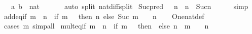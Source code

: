 \begin{isabellebody}
\ \ \ a\ b\ {\isacharcolon}{\kern0pt}{\isacharcolon}{\kern0pt}\ nat\isanewline
\ \ %
\isanewline
%
\isadelimproof
\ \ %
\endisadelimproof
%
\isatagproof
{}\isamarkupfalse%
\ {\isacharparenleft}{\kern0pt}auto\ split{\isacharcolon}{\kern0pt}\ nat{\isacharunderscore}{\kern0pt}diff{\isacharunderscore}{\kern0pt}split{\isacharparenright}{\kern0pt}%
\endisatagproof
{\isafoldproof}%
%
\isadelimproof
\isanewline
%
\endisadelimproof
\isanewline
{}\isamarkupfalse%
\ Suc{\isacharunderscore}{\kern0pt}pred{\isacharprime}{\kern0pt}{\isacharcolon}{\kern0pt}\ {\isachardoublequoteopen}{}\ {\isacharless}{\kern0pt}\ n\ {\isasymLongrightarrow}\ n\ {\isacharequal}{\kern0pt}\ Suc{\isacharparenleft}{\kern0pt}n\ {\isacharminus}{\kern0pt}\ {}{\isacharparenright}{\kern0pt}{\isachardoublequoteclose}\isanewline
%
\isadelimproof
\ \ %
\endisadelimproof
%
\isatagproof
{}\isamarkupfalse%
\ simp%
\endisatagproof
{\isafoldproof}%
%
\isadelimproof
\isanewline
%
\endisadelimproof
\isanewline
{}\isamarkupfalse%
\ add{\isacharunderscore}{\kern0pt}eq{\isacharunderscore}{\kern0pt}if{\isacharcolon}{\kern0pt}\ {\isachardoublequoteopen}m\ {\isacharplus}{\kern0pt}\ n\ {\isacharequal}{\kern0pt}\ {\isacharparenleft}{\kern0pt}if\ m\ {\isacharequal}{\kern0pt}\ {}\ then\ n\ else\ Suc\ {\isacharparenleft}{\kern0pt}{\isacharparenleft}{\kern0pt}m\ {\isacharminus}{\kern0pt}\ {}{\isacharparenright}{\kern0pt}\ {\isacharplus}{\kern0pt}\ n{\isacharparenright}{\kern0pt}{\isacharparenright}{\kern0pt}{\isachardoublequoteclose}\isanewline
%
\isadelimproof
\ \ %
\endisadelimproof
%
\isatagproof
{}\isamarkupfalse%
\ One{\isacharunderscore}{\kern0pt}nat{\isacharunderscore}{\kern0pt}def\ \isamarkupfalse%
\ {\isacharparenleft}{\kern0pt}cases\ m{\isacharparenright}{\kern0pt}\ simp{\isacharunderscore}{\kern0pt}all%
\endisatagproof
{\isafoldproof}%
%
\isadelimproof
\isanewline
%
\endisadelimproof
\isanewline
{}\isamarkupfalse%
\ mult{\isacharunderscore}{\kern0pt}eq{\isacharunderscore}{\kern0pt}if{\isacharcolon}{\kern0pt}\ {\isachardoublequoteopen}m\ {\isacharasterisk}{\kern0pt}\ n\ {\isacharequal}{\kern0pt}\ {\isacharparenleft}{\kern0pt}if\ m\ {\isacharequal}{\kern0pt}\ {}\ then\ {}\ else\ n\ {\isacharplus}{\kern0pt}\ {\isacharparenleft}{\kern0pt}{\isacharparenleft}{\kern0pt}m\ {\isacharminus}{\kern0pt}\ {}{\isacharparenright}{\kern0pt}\ {\isacharasterisk}{\kern0pt}\ n{\isacharparenright}{\kern0pt}{\isacharparenright}{\kern0pt}{\isachardoublequoteclose}\isanewline

\end{isabellebody}
